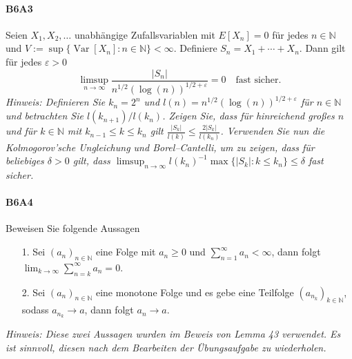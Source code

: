 \documentclass{article}
\begin{document}
\paragraph{B6A3}
Seien $X_1,X_2,\dots$ unabhängige Zufallsvariablen mit $E[X_n]=0$ für jedes $n\in\mathbb{N}$ und $V:=\sup\{\operatorname{Var}[X_n]:n\in\mathbb{N}\}<\infty$.
Definiere $S_n=X_1+\cdots+X_n$.
Dann gilt für jedes $\varepsilon>0$
\[
  \limsup_{n\to\infty}\frac{|S_n|}{n^{1/2}(\log(n))^{1/2+\varepsilon}}=0\quad\text{fast sicher.}
\]
\emph{Hinweis: Definieren Sie $k_n=2^n$ und $l(n)=n^{1/2}(\log(n))^{1/2+\varepsilon}$ für $n\in\mathbb{N}$ und betrachten Sie $l(k_{n+1})/l(k_n)$.
  Zeigen Sie, dass für hinreichend großes $n$ und für $k\in\mathbb{N}$ mit $k_{n-1}\leq k\leq k_n$ gilt $\frac{|S_k|}{l(k)}\leq\frac{2|S_k|}{l({k_n})}$.
Verwenden Sie nun die Kolmogorov'sche Ungleichung und Borel--Cantelli, um zu zeigen, dass für beliebiges $\delta>0$ gilt, dass $\limsup_{n\to\infty}l(k_n)^{-1}\max\{|S_k|: k\leq k_n\}\leq\delta$ fast sicher.}
\newpage

\paragraph{B6A4}
Beweisen Sie folgende Aussagen
\begin{enumerate}
\item[1.] Sei $(a_n)_{n\in\mathbb{N}}$ eine Folge mit $a_n\geq0$ und $\sum_{n=1}^\infty a_n<\infty$, dann folgt $\lim_{k\to\infty}\sum_{n=k}^\infty a_n=0$.
\item[2.] Sei $(a_n)_{n\in\mathbb{N}}$ eine monotone Folge und es gebe eine Teilfolge $(a_{n_k})_{k\in\mathbb{N}}$, sodass $a_{n_k}\to a$, dann folgt $a_n\to a$.
\end{enumerate}
\emph{Hinweis: Diese zwei Aussagen wurden im Beweis von Lemma 43 verwendet.
Es ist sinnvoll, diesen nach dem Bearbeiten der Übungsaufgabe zu wiederholen.}
\newpage



\end{document}
